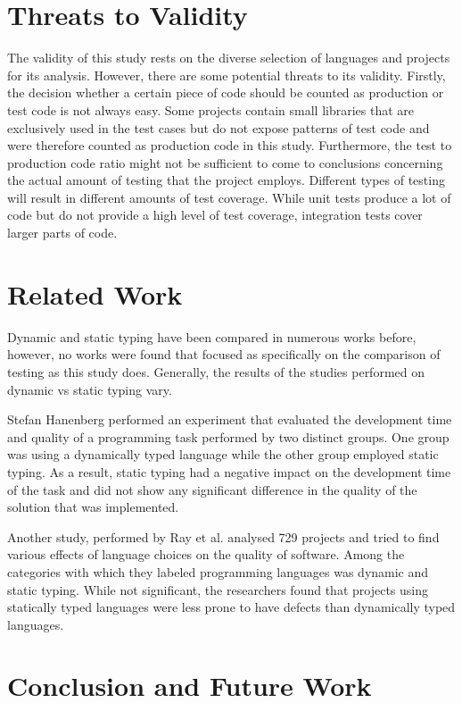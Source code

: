 \documentclass[conference]{IEEEtran}
\begin{document}
\section{Threats to Validity}

The validity of this study rests on the diverse selection of languages and projects for its analysis. However, there are some potential threats to its validity. Firstly, the decision whether a certain piece of code should be counted as production or test code is not always easy. Some projects contain small libraries that are exclusively used in the test cases but do not expose patterns of test code and were therefore counted as production code in this study. Furthermore, the test to production code ratio might not be sufficient to come to conclusions concerning the actual amount of testing that the project employs. Different types of testing will result in different amounts of test coverage. While unit tests produce a lot of code but do not provide a high level of test coverage, integration tests cover larger parts of code.

\section{Related Work}

Dynamic and static typing have been compared in numerous works before, however, no works were found that focused as specifically on the comparison of testing as this study does. Generally, the results of the studies performed on dynamic vs static typing vary.

Stefan Hanenberg performed an experiment that evaluated the development time and quality of a programming task performed by two distinct groups. One group was using a dynamically typed language while the other group employed static typing. As a result, static typing had a negative impact on the development time of the task and did not show any significant difference in the quality of the solution that was implemented.\cite{hanenberg_typing_experiment}

Another study, performed by Ray et al. analysed 729 projects and tried to find various effects of language choices on the quality of software. Among the categories with which they labeled programming languages was dynamic and static typing. While not significant, the researchers found that projects using statically typed languages were less prone to have defects than dynamically typed languages.\cite{ray_large_scale_study}


\section{Conclusion and Future Work}
\end{document}

